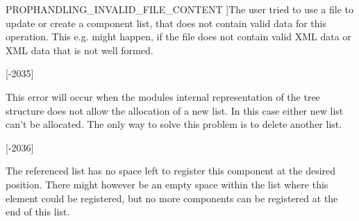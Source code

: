 \begin{Desc}
\begin{description}
{\hypertarget{group___common_interface_gga61b0634ab285d9a2a303e0092167127ead10f41e19b67cb5685b6aba8e8d258b8}{P\+R\+O\+P\+H\+A\+N\+D\+L\+I\+N\+G\+\_\+\+I\+N\+V\+A\+L\+I\+D\+\_\+\+F\+I\+L\+E\+\_\+\+C\+O\+N\+T\+E\+N\+T}\label{group___common_interface_gga61b0634ab285d9a2a303e0092167127ead10f41e19b67cb5685b6aba8e8d258b8}
}]The user tried to use a file to update or create a component list, that does not contain valid data for this operation. This e.\+g. might happen, if the file does not contain valid X\+M\+L data or X\+M\+L data that is not well formed.

{\bfseries }\mbox{[}-\/2035\mbox{]} \item[{\em 
\hypertarget{group___common_interface_gga61b0634ab285d9a2a303e0092167127eac61d69179a3d6d509d1c2f3f425d39cb}{P\+R\+O\+P\+H\+A\+N\+D\+L\+I\+N\+G\+\_\+\+C\+A\+N\+T\+\_\+\+A\+L\+L\+O\+C\+A\+T\+E\+\_\+\+L\+I\+S\+T}\label{group___common_interface_gga61b0634ab285d9a2a303e0092167127eac61d69179a3d6d509d1c2f3f425d39cb}
}]This error will occur when the modules internal representation of the tree structure does not allow the allocation of a new list. In this case either new list can't be allocated. The only way to solve this problem is to delete another list.

{\bfseries }\mbox{[}-\/2036\mbox{]} \item[{\em 
\hypertarget{group___common_interface_gga61b0634ab285d9a2a303e0092167127ea13dd949b99e3141e33f848350d965b58}{P\+R\+O\+P\+H\+A\+N\+D\+L\+I\+N\+G\+\_\+\+C\+A\+N\+T\+\_\+\+R\+E\+G\+I\+S\+T\+E\+R\+\_\+\+C\+O\+M\+P\+O\+N\+E\+N\+T}\label{group___common_interface_gga61b0634ab285d9a2a303e0092167127ea13dd949b99e3141e33f848350d965b58}
}]The referenced list has no space left to register this component at the desired position. There might however be an empty space within the list where this element could be registered, but no more components can be registered at the end of this list.


\end{description}
\end{Desc}
